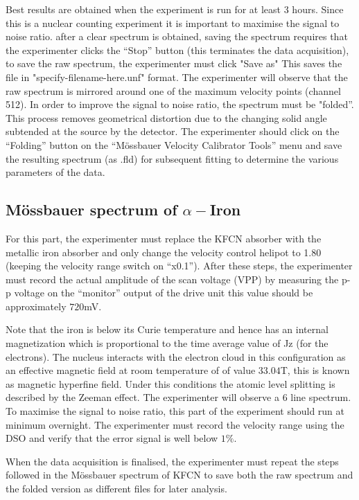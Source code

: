 \documentclass[a4paper, twocolumn]{article}
\begin{document}
Best results are obtained when the experiment is run for at least 3 hours. Since this is a nuclear counting experiment it is important to maximise the signal to noise ratio. after a clear spectrum is obtained, saving the spectrum requires that the experimenter clicks the “Stop” button (this terminates the data acquisition), to save the raw spectrum, the experimenter must click "Save as" This saves the file in "specify-filename-here.unf" format.
The experimenter will observe that the raw spectrum is mirrored around one of the maximum velocity points (channel 512)\cite{0}. In order to improve the signal to noise ratio, the spectrum must be "folded”. This process removes geometrical distortion due to the changing solid angle subtended at the source by the detector. The experimenter should click on the “Folding” button on the “Mössbauer Velocity Calibrator Tools” menu and save the resulting spectrum (as .fld) for subsequent fitting to determine the various parameters of the data\cite{0}.

\subsection{Mössbauer spectrum of $\alpha-$Iron}

For this part, the experimenter must replace the KFCN absorber with the metallic iron absorber and only change the velocity control helipot to 1.80 (keeping the velocity range switch on “x0.1”). After these steps, the experimenter must record the actual amplitude of the scan voltage (VPP) by measuring the p-p voltage on the “monitor” output of the drive unit this value should be approximately $720$mV\cite{0}.

Note that the iron is below its Curie temperature and hence has an internal magnetization which is proportional to the time average value of Jz (for the electrons). The nucleus interacts with the electron cloud in this configuration as an effective magnetic field at room temperature of of value $33.04$T, this is known as magnetic hyperfine field. Under this conditions the atomic level splitting is described by the Zeeman effect. The experimenter will observe a 6 line spectrum\cite{0}\cite{8}.
To maximise the signal to noise ratio, this part of the experiment should run at minimum overnight. The experimenter must record the velocity range using the DSO and verify that the error signal is well below $1\%$\cite{0}.

When the data acquisition is finalised, the experimenter must repeat the steps followed in the Mössbauer spectrum of KFCN to save both the raw spectrum and the folded version as different files for later analysis\cite{0}.
\end{document}
